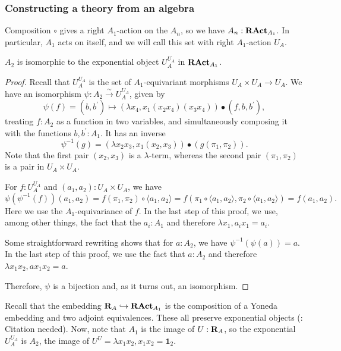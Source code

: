 \subsubsection{Constructing a theory from an algebra}

\begin{definition}
  Composition $ \circ $ gives a right $ A_1 $-action on the $ A_n $, so we have $ A_n : \mathbf{RAct}_{A_1} $. In particular, $ A_1 $ acts on itself, and we will call this set with right $ A_1 $-action $ U_A $.
\end{definition}

\begin{lemma}
  $ A_2 $ is isomorphic to the exponential object $ U_A^{U_A} $ in $ \mathbf{RAct}_{A_1} $.
\end{lemma}
\begin{proof}
  Recall that $ U_A^{U_A} $ is the set of $ A_1 $-equivariant morphisms $ U_A \times U_A \to U_A $. We have an isomorphism $ \psi: A_2 \xrightarrow \sim U_A^{U_A} $, given by
  \[ \psi(f) = (b, b^\prime) \mapsto (\lambda x_4, x_1 (x_2 x_4) (x_3 x_4)) \bullet (f, b, b^\prime), \]
  treating $ f : A_2 $ as a function in two variables, and simultaneously composing it with the functions $ b, b^\prime : A_1 $. It has an inverse
  \[ \psi^{-1}(g) = (\lambda x_2 x_3, x_1 (x_2, x_3)) \bullet (g(\pi_1, \pi_2)). \]
  Note that the first pair $ (x_2, x_3) $ is a $ \lambda $-term, whereas the second pair $ (\pi_1, \pi_2) $ is a pair in $ U_A \times U_A $.

  For $ f: U_A^{U_A} $ and $ (a_1, a_2): U_A \times U_A $, we have
  \[
    \psi(\psi^{-1}(f))(a_1, a_2)
    = f(\pi_1, \pi_2) \circ \langle a_1, a_2 \rangle
    = f(\pi_1 \circ \langle a_1, a_2 \rangle, \pi_2 \circ \langle a_1, a_2 \rangle)
    = f(a_1, a_2).
  \]
  Here we use the $ A_1 $-equivariance of $ f $. In the last step of this proof, we use, among other things, the fact that the $ a_i : A_1 $ and therefore $ \lambda x_1, a_i x_1 = a_i $.

  Some straightforward rewriting shows that for $ a: A_2 $, we have $ \psi^{-1}(\psi(a)) = a $. In the last step of this proof, we use the fact that $ a : A_2 $ and therefore $ \lambda x_1 x_2, a x_1 x_2 = a $.

  Therefore, $ \psi $ is a bijection and, as it turns out, an isomorphism.
\end{proof}

\begin{remark}
  Recall that the embedding $ \mathbf{R}_A \hookrightarrow \mathbf{RAct}_{A_1} $ is the composition of a Yoneda embedding and two adjoint equivalences. These all preserve exponential objects (\TODO: Citation needed). Now, note that $ A_1 $ is the image of $ U : \mathbf{R}_A $, so the exponential $ U_A^{U_A} $ is $ A_2 $, the image of $ U^U = \lambda x_1 x_2, x_1 x_2 = \mathbf 1_2 $.
\end{remark}

